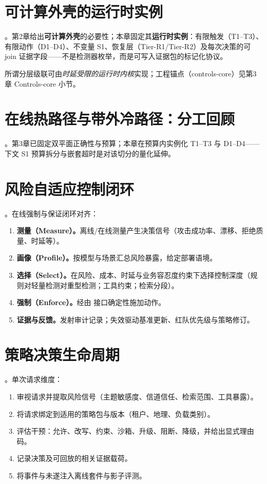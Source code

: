 \documentclass[11pt,a4paper]{report}
\begin{document}
\section{可计算外壳的运行时实例}
\DecoupledSafety{}。第2章给出\textbf{可计算外壳}的必要性；本章固定其\textbf{运行时实例}：有限触发（T1--T3）、有限动作（D1--D4）、不变量 S1、恢复层（Tier-R1/Tier-R2）及每次决策的可 join 证据字段——不是检测器枚举，而是可写入证据包的标记化协议。

所谓分层级联可由\emph{时延受限的运行时内核}实现；工程锚点（controls-core）见第3章 Controls-core 小节。

\section{在线热路径与带外冷路径：分工回顾}
\ControlPlane{}。第3章已固定双平面正确性与预算；本章在预算内实例化 T1--T3 与 D1--D4——下文 S1 预算拆分与嵌套超时是对该切分的量化延伸。

\section{风险自适应控制闭环}
\ControlPlane{}。在线强制与保证闭环对齐：
\begin{enumerate}
  \item \textbf{测量（Measure）。}离线/在线测量产生决策信号（攻击成功率、漂移、拒绝质量、时延等）。
  \item \textbf{画像（Profile）。}按模型与场景汇总风险暴露，给定部署语境。
  \item \textbf{选择（Select）。}在风险、成本、时延与业务容忍度约束下选择控制深度（规则对轻量检测对重型检测；工具约束；检索分段）。
  \item \textbf{强制（Enforce）。}经由 \SafetyKernel{} 接口确定性施加动作。
  \item \textbf{证据与反馈。}发射审计记录；失效驱动基准更新、红队优先级与策略修订。
\end{enumerate}

\section{策略决策生命周期}
\DecoupledSafety{}。单次请求维度：
\begin{enumerate}
  \item 审视请求并提取风险信号（主题敏感度、信道信任、检索范围、工具暴露）。
  \item 将请求绑定到适用的策略包与版本（租户、地理、负载类别）。
  \item 评估干预：允许、改写、约束、沙箱、升级、阻断、降级，并给出显式理由码。
  \item 记录决策及可回放的相关证据载荷。
  \item 将事件与未遂注入离线套件与影子评测。
\end{enumerate}
\end{document}
